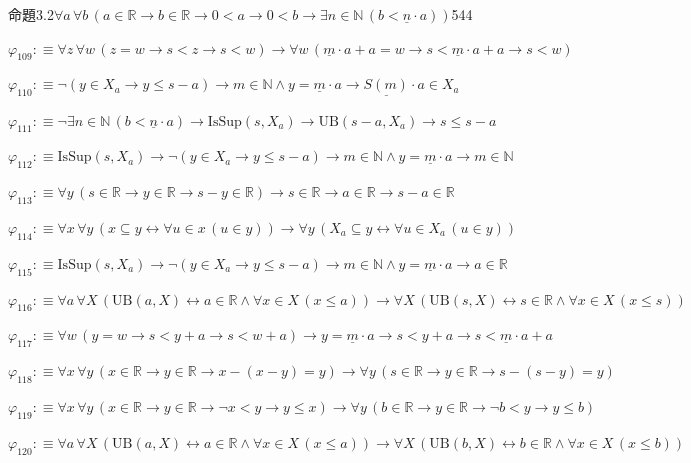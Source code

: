 \begin{fullproof}{命題3.2}{$\forall a\,\forall b\,(a \in \mathbb{R} \to b \in \mathbb{R} \to 0 < a \to 0 < b \to \exists n \in \mathbb{N}\,(b < \underline{n} \cdot a))$}{544}
\begin{abbrevlist}
\item $\varphi_{109} :\equiv \forall z\,\forall w\,(z = w \to s < z \to s < w) \to \forall w\,(\underline{m} \cdot a + a = w \to s < \underline{m} \cdot a + a \to s < w)$
\item $\varphi_{110} :\equiv \neg (y \in X_{a} \to y \leq s - a) \to m \in \mathbb{N} \land y = \underline{m} \cdot a \to \underline{S(m)} \cdot a \in X_{a}$
\item $\varphi_{111} :\equiv \neg \exists n \in \mathbb{N}\,(b < \underline{n} \cdot a) \to \mathrm{IsSup}(s,X_{a}) \to \mathrm{UB}(s - a,X_{a}) \to s \leq s - a$
\item $\varphi_{112} :\equiv \mathrm{IsSup}(s,X_{a}) \to \neg (y \in X_{a} \to y \leq s - a) \to m \in \mathbb{N} \land y = \underline{m} \cdot a \to m \in \mathbb{N}$
\item $\varphi_{113} :\equiv \forall y\,(s \in \mathbb{R} \to y \in \mathbb{R} \to s - y \in \mathbb{R}) \to s \in \mathbb{R} \to a \in \mathbb{R} \to s - a \in \mathbb{R}$
\item $\varphi_{114} :\equiv \forall x\,\forall y\,(x \subseteq y \leftrightarrow \forall u \in x\,(u \in y)) \to \forall y\,(X_{a} \subseteq y \leftrightarrow \forall u \in X_{a}\,(u \in y))$
\item $\varphi_{115} :\equiv \mathrm{IsSup}(s,X_{a}) \to \neg (y \in X_{a} \to y \leq s - a) \to m \in \mathbb{N} \land y = \underline{m} \cdot a \to a \in \mathbb{R}$
\item $\varphi_{116} :\equiv \forall a\,\forall X\,(\mathrm{UB}(a,X) \leftrightarrow a \in \mathbb{R} \land \forall x \in X\,(x \leq a)) \to \forall X\,(\mathrm{UB}(s,X) \leftrightarrow s \in \mathbb{R} \land \forall x \in X\,(x \leq s))$
\item $\varphi_{117} :\equiv \forall w\,(y = w \to s < y + a \to s < w + a) \to y = \underline{m} \cdot a \to s < y + a \to s < \underline{m} \cdot a + a$
\item $\varphi_{118} :\equiv \forall x\,\forall y\,(x \in \mathbb{R} \to y \in \mathbb{R} \to x - (x - y) = y) \to \forall y\,(s \in \mathbb{R} \to y \in \mathbb{R} \to s - (s - y) = y)$
\item $\varphi_{119} :\equiv \forall x\,\forall y\,(x \in \mathbb{R} \to y \in \mathbb{R} \to \neg x < y \to y \leq x) \to \forall y\,(b \in \mathbb{R} \to y \in \mathbb{R} \to \neg b < y \to y \leq b)$
\item $\varphi_{120} :\equiv \forall a\,\forall X\,(\mathrm{UB}(a,X) \leftrightarrow a \in \mathbb{R} \land \forall x \in X\,(x \leq a)) \to \forall X\,(\mathrm{UB}(b,X) \leftrightarrow b \in \mathbb{R} \land \forall x \in X\,(x \leq b))$

\end{abbrevlist}
\end{fullproof}
